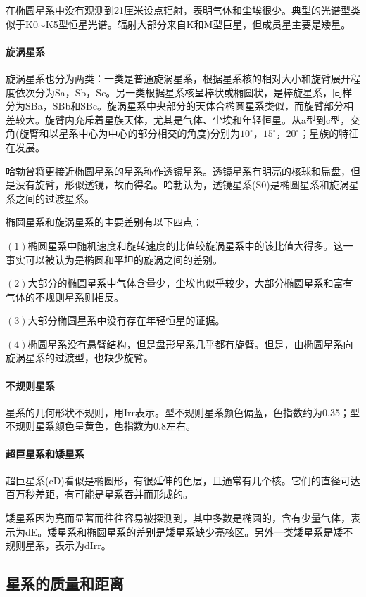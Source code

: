 在椭圆星系中没有观测到21厘米设点辐射，表明气体和尘埃很少。典型的光谱型类似于K0$\sim$K5型恒星光谱。辐射大部分来自K和M型巨星，但成员星主要是矮星。
\paragraph{旋涡星系}旋涡星系也分为两类：一类是普通旋涡星系，根据星系核的相对大小和旋臂展开程度依次分为Sa，Sb，Sc。另一类根据星系核呈棒状或椭圆状，是棒旋星系，同样分为SBa，SBb和SBc。旋涡星系中央部分的天体合椭圆星系类似，而旋臂部分相差较大。旋臂内充斥着星族天体，尤其是气体、尘埃和年轻恒星。从a型到c型，交角(旋臂和以星系中心为中心的部分相交的角度)分别为$10^\circ$，$15^\circ$，$20^\circ$；星族的特征在发展。

哈勃曾将更接近椭圆星系的星系称作透镜星系。透镜星系有明亮的核球和扁盘，但是没有旋臂，形似透镜，故而得名。哈勃认为，透镜星系(S0)是椭圆星系和旋涡星系之间的过渡星系。

椭圆星系和旋涡星系的主要差别有以下四点：

$\left(1\right)$椭圆星系中随机速度和旋转速度的比值较旋涡星系中的该比值大得多。这一事实可以被认为是椭圆和平坦的旋涡之间的差别。

$\left(2\right)$大部分的椭圆星系中气体含量少，尘埃也似乎较少，大部分椭圆星系和富有气体的不规则星系则相反。

$\left(3\right)$大部分椭圆星系中没有存在年轻恒星的证据。

$\left(4\right)$椭圆星系没有悬臂结构，但是盘形星系几乎都有旋臂。但是，由椭圆星系向旋涡星系的过渡型，也缺少旋臂。

\paragraph{不规则星系}星系的几何形状不规则，用Irr表示。型不规则星系颜色偏蓝，色指数约为0.35；型不规则星系颜色呈黄色，色指数为0.8左右。
\paragraph{超巨星系和矮星系}超巨星系(cD)看似是椭圆形，有很延伸的色层，且通常有几个核。它们的直径可达百万秒差距，有可能是星系吞并而形成的。

矮星系因为亮而显著而往往容易被探测到，其中多数是椭圆的，含有少量气体，表示为dE。矮星系和椭圆星系的差别是矮星系缺少亮核区。另外一类矮星系是矮不规则星系，表示为dIrr。
\subsection{星系的质量和距离}
